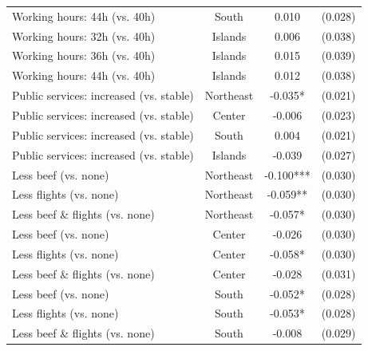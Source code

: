 \begin{table}[H]
\begin{tabular}{ l c c c }
\hspace{0.05cm} Working hours: 44h (vs. 40h) & South & 0.010 & (0.028) \\
\hspace{0.05cm} Working hours: 32h (vs. 40h) & Islands & 0.006 & (0.038) \\
\hspace{0.05cm} Working hours: 36h (vs. 40h) & Islands & 0.015 & (0.039) \\
\hspace{0.05cm} Working hours: 44h (vs. 40h) & Islands & 0.012 & (0.038) \\
\hspace{0.05cm} Public services: increased (vs. stable) & Northeast & -0.035* & (0.021) \\
\hspace{0.05cm} Public services: increased (vs. stable) & Center & -0.006 & (0.023) \\
\hspace{0.05cm} Public services: increased (vs. stable) & South & 0.004 & (0.021) \\
\hspace{0.05cm} Public services: increased (vs. stable) & Islands & -0.039 & (0.027) \\
\hspace{0.05cm} Less beef (vs. none) & Northeast & -0.100*** & (0.030) \\
\hspace{0.05cm} Less flights (vs. none) & Northeast & -0.059** & (0.030) \\
\hspace{0.05cm} Less beef \& flights (vs. none) & Northeast & -0.057* & (0.030) \\
\hspace{0.05cm} Less beef (vs. none) & Center & -0.026 & (0.030) \\
\hspace{0.05cm} Less flights (vs. none) & Center & -0.058* & (0.030) \\
\hspace{0.05cm} Less beef \& flights (vs. none) & Center & -0.028 & (0.031) \\
\hspace{0.05cm} Less beef (vs. none) & South & -0.052* & (0.028) \\
\hspace{0.05cm} Less flights (vs. none) & South & -0.053* & (0.028) \\
\hspace{0.05cm} Less beef \& flights (vs. none) & South & -0.008 & (0.029) \\

\end{tabular}
\end{table}
